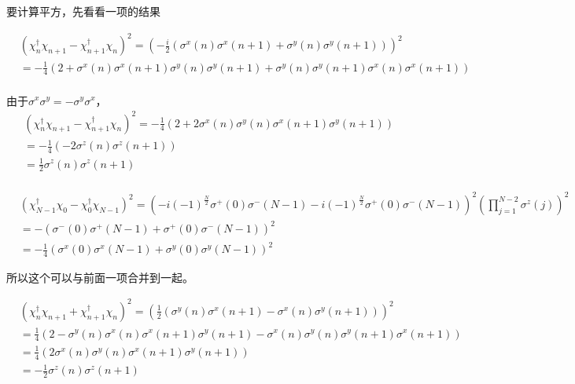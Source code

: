 要计算平方，先看看一项的结果

\begin{equation}
\begin{split}
&\left(\chi^{\dagger}_n\chi_{n+1}-\chi^{\dagger}_{n+1}\chi _n\right)^2 = \left(-\frac{i}{2}\left(\sigma ^x(n)\sigma ^x(n+1)+\sigma ^y(n)\sigma ^y(n+1)\right)\right)^2\\
&=-\frac{1}{4}\left(2+\sigma ^x(n)\sigma ^x(n+1)\sigma ^y(n)\sigma ^y(n+1)+\sigma ^y(n)\sigma ^y(n+1)\sigma ^x(n)\sigma ^x(n+1)\right)\\
\end{split}
\end{equation}

由于$\sigma ^x\sigma ^y = -\sigma ^y\sigma ^x$，
\begin{equation}
\begin{split}
&\left(\chi^{\dagger}_n\chi_{n+1}-\chi^{\dagger}_{n+1}\chi _n\right)^2 = -\frac{1}{4}\left(2+2\sigma ^x(n)\sigma ^y(n)\sigma ^x(n+1)\sigma ^y(n+1)\right)\\
&= -\frac{1}{4}\left(-2\sigma ^z(n)\sigma ^z(n+1)\right)\\
&=\frac{1}{2}\sigma ^z(n)\sigma ^z(n+1)\\
\end{split}
\end{equation}

\begin{equation}
\begin{split}
&\left(\chi^{\dagger}_{N-1}\chi_{0}-\chi^{\dagger}_{0}\chi _{N-1}\right)^2 = \left(-i(-1)^{\frac{N}{2}}\sigma ^+(0)\sigma ^-(N-1)-i(-1)^{\frac{N}{2}}\sigma ^+(0)\sigma ^-(N-1)\right)^2\left(\prod _{j=1}^{N-2}\sigma ^z(j)\right)^2\\
&=-\left(\sigma ^-(0)\sigma ^+(N-1)+\sigma ^+(0)\sigma ^-(N-1)\right)^2\\
&=-\frac{1}{4}\left(\sigma ^x(0)\sigma ^x(N-1)+\sigma ^y(0)\sigma ^y(N-1)\right)^2
\end{split}
\end{equation}

所以这个可以与前面一项合并到一起。

\begin{equation}
\begin{split}
&\left(\chi^{\dagger}_n\chi_{n+1}+\chi^{\dagger}_{n+1}\chi _n\right)^2 = \left(\frac{1}{2}\left(\sigma ^y(n)\sigma ^x(n+1)-\sigma ^x(n)\sigma ^y(n+1)\right)\right)^2\\
&=\frac{1}{4}\left(2-\sigma ^y(n)\sigma ^x(n)\sigma ^x(n+1)\sigma ^y(n+1)-\sigma ^x(n)\sigma ^y(n)\sigma ^y(n+1)\sigma ^x(n+1)\right)\\
&=\frac{1}{4}\left(2\sigma ^x(n)\sigma ^y(n)\sigma ^x(n+1)\sigma ^y(n+1)\right)\\
&=-\frac{1}{2}\sigma ^z(n)\sigma ^z(n+1)\\
\end{split}
\end{equation}

